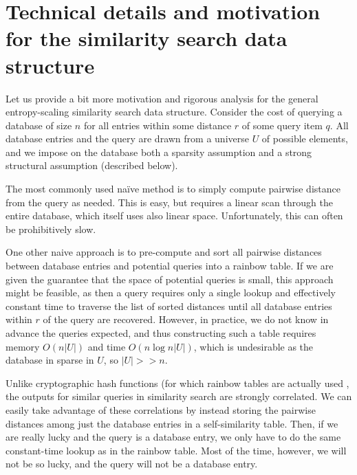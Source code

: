 \documentclass{amsbook}
\theoremstyle{definition}
\theoremstyle{remark}
\numberwithin{equation}{section}
\begin{document}
\section{Technical details and motivation for the similarity search data structure}
Let us provide a bit more motivation and rigorous analysis for the general entropy-scaling similarity search data structure.
Consider the cost of querying a database of size $n$ for all entries within some distance $r$ of some query item $q$.
All database entries and the query are drawn from a universe $U$ of possible elements, and we impose on the database both a sparsity assumption and a strong structural assumption (described below).

The most commonly used na\"ive method is to simply compute pairwise distance from the query as needed.
This is easy, but requires a linear scan through the entire database, which itself uses also linear space.
Unfortunately, this can often be prohibitively slow.

One other naive approach is to pre-compute and sort all pairwise distances between database entries and potential queries into a rainbow table.
If we are given the guarantee that the space of potential queries is small, this approach might be feasible, as then a query requires only a single lookup and effectively constant time to traverse the list of sorted distances until all database entries within $r$ of the query are recovered.
However, in practice, we do not know in advance the queries expected, and thus constructing such a table requires memory $O(n|U|)$ and time $O(n \log n |U|)$, which is undesirable as the database in sparse in $U$, so $|U| >>n$.

Unlike cryptographic hash functions (for which rainbow tables are actually used \cite{oechslin2003making}, the outputs for similar queries in similarity search are strongly correlated.
We can easily take advantage of these correlations by instead storing the pairwise distances among just the database entries in a self-similarity table.
Then, if we are really lucky and the query is a database entry, we only have to do the same constant-time lookup as in the rainbow table.
Most of the time, however, we will not be so lucky, and the query will not be a database entry.
\end{document}
